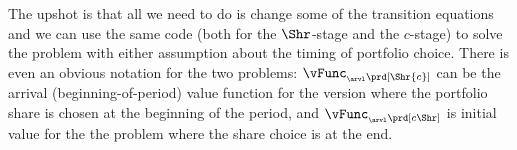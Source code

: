 \documentclass[\econtexRoot/SolvingMicroDSOPs]{subfiles}
\begin{document}
The upshot is that all we need to do is change some of the transition equations and we can use the same code (both for the $\Shr$-stage and the ${c}$-stage) to solve the problem with either assumption about the timing of portfolio choice.  There is even an obvious notation for the two problems: $\vFunc_{_\arvl\prd[\Shr{c}]}$ can be the arrival (beginning-of-period) value function for the version where the portfolio share is chosen at the beginning of the period, and $\vFunc_{_\arvl\prd[{c}\Shr]}$ is initial value for the the problem where the share choice is at the end.





\end{document}
